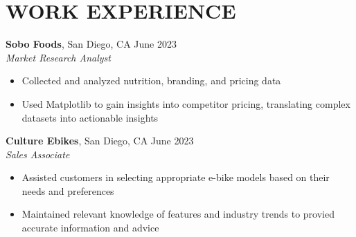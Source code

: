 \section*{WORK EXPERIENCE}
\noindent
\textbf{Sobo Foods}, San Diego, CA \hfill June 2023 \\
\textit{Market Research Analyst}
\begin{itemize}
	\item Collected and analyzed nutrition, branding, and pricing data
	\item Used Matplotlib to gain insights into competitor pricing, translating complex datasets into actionable insights \\
\end{itemize}

\noindent
\textbf{Culture Ebikes}, San Diego, CA \hfill June 2023 \\
\textit{Sales Associate}
\begin{itemize}
	\item Assisted customers in selecting appropriate e-bike models based on their needs and preferences
	\item Maintained relevant knowledge of  features and industry trends to provied accurate information and advice
\end{itemize}

